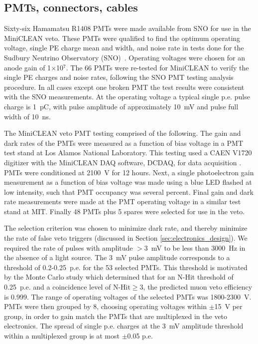 \documentclass[review,number,sort&compress]{elsarticle}
\begin{document}
\subsection{PMTs, connectors, cables}
\label{sec:pmts}
%
Sixty-six Hamamatsu R1408 PMTs were made available from SNO for use in the
MiniCLEAN veto. These PMTs were qualified to find the optimum
operating voltage, single PE charge mean and width, and noise rate in
tests done for the Sudbury Neutrino Observatory
(SNO)~\cite{ref:sno_pmt_paper}.  Operating voltages were chosen for an
anode gain of 1$\times$10$^7$.  The 66 PMTs were re-tested for
MiniCLEAN to verify the single PE charges and noise rates, following
the SNO PMT testing analysis procedure.  In all cases except one
broken PMT the test results were consistent with the SNO measurements.
At the operating voltage a typical single p.e. pulse charge is 1~pC,
with pulse amplitude of approximately 10~mV and pulse full width of
10~ns.

The MiniCLEAN veto PMT testing comprised of the following.  The gain and
dark rates of the PMTs were measured as a function of bias voltage
in a PMT test stand at Los Alamos National Laboratory.  This testing used a CAEN
V1720 digitizer with the MiniCLEAN DAQ software, DCDAQ, for data
acquisition \cite{ref:gastler_thesis}. PMTs were conditioned at 2100~V
for 12 hours. Next, a single photoelectron gain measurement as a
function of bias voltage was made using a blue LED flashed at low
intensity, such that PMT occupancy was several percent. Final gain and
dark rate measurements were made at the PMT operating voltage in a
similar test stand at MIT. Finally 48 PMTs plus 5 spares were selected for
use in the veto. 

The selection criterion was chosen to minimize dark rate, and thereby
minimize the rate of false veto triggers (discussed in Section
\ref{sec:electronics_design}).  We required the rate of pulses with
amplitude $>$3~mV to be less than 3000~Hz in the absence of a light
source.  The 3~mV pulse amplitude corresponds to a threshold of
0.2-0.25~p.e. for the 53 selected PMTs.  This threshold is motivated
by the Monte Carlo study which determined that for an N-Hit threshold
of 0.25~p.e. and a coincidence level of N-Hit$\ge$3, the predicted
muon veto efficiency is 0.999.  The range of operating voltages of the
selected PMTs was 1800-2300~V.  PMTs were then grouped by 8, choosing
operating voltages within $\pm$15~V per group, in order to gain match
the PMTs that are multiplexed in the veto electronics.  The spread of
single p.e. charges at the 3~mV amplitude threshold within a
multiplexed group is at most $\pm$0.05 p.e.
\end{document}
